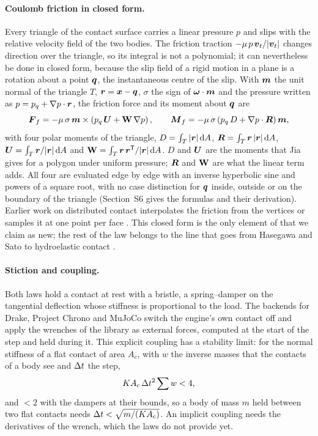 \paragraph{Coulomb friction in closed form.} Every triangle of the contact surface carries a
linear pressure $p$ and slips with the relative velocity field of the two bodies. The friction
traction $-\mu\,p\,\boldsymbol{v}_t/|\boldsymbol{v}_t|$ changes direction over the triangle, so its integral is not a
polynomial; it can nevertheless be done in closed form, because the slip field of a rigid
motion in a plane is a rotation about a point $\boldsymbol{q}$, the instantaneous centre of the slip. With
$\boldsymbol{m}$ the unit normal of the triangle $T$, $\boldsymbol{r} = \boldsymbol{x} - \boldsymbol{q}$, $\sigma$ the sign of $\boldsymbol{\omega}\cdot\boldsymbol{m}$ and
the pressure written as $p = p_q + \nabla p\cdot\boldsymbol{r}$, the friction force and its moment about
$\boldsymbol{q}$ are
\begin{equation}
  \boldsymbol{F}_f = -\mu\,\sigma\,\boldsymbol{m}\times\left(p_q\,\boldsymbol{U} + \mathbf{W}\,\nabla p\right), \qquad
  \boldsymbol{M}_f = -\mu\,\sigma\left(p_q\,D + \nabla p\cdot\boldsymbol{R}\right)\boldsymbol{m} ,
  \label{sh:friction}
\end{equation}
with four polar moments of the triangle,
$D = \int_T |\boldsymbol{r}|\,\mathrm{d} A$, $\boldsymbol{R} = \int_T \boldsymbol{r}\,|\boldsymbol{r}|\,\mathrm{d} A$,
$\boldsymbol{U} = \int_T \boldsymbol{r}/|\boldsymbol{r}|\,\mathrm{d} A$ and $\mathbf{W} = \int_T \boldsymbol{r}\,\boldsymbol{r}^{\mathsf T}/|\boldsymbol{r}|\,\mathrm{d} A$.
$D$ and $\boldsymbol{U}$ are the moments that Jia \cite{Jia1997} gives for a polygon under uniform
pressure; $\boldsymbol{R}$ and $\mathbf{W}$ are what the linear term adds. All four are evaluated edge
by edge with an inverse hyperbolic sine and powers of a square root, with no case distinction
for $\boldsymbol{q}$ inside, outside or on the boundary of the triangle (Section~S6 gives the formulas and
their derivation). Earlier work on distributed contact interpolates the friction from the
vertices or samples it at one point per face \cite{Hasegawa2004,Hippmann2004}. This closed
form is the only element of  that we claim as new; the rest of the law
belongs to the line that goes from Hasegawa and Sato \cite{Hasegawa2004} to hydroelastic
contact \cite{Elandt2019}.

\paragraph{Stiction and coupling.} Both laws hold a contact at rest with a bristle, a
spring--damper on the tangential deflection whose stiffness is proportional to the load. The backends for Drake, Project Chrono
and MuJoCo switch the engine's own contact off and apply the wrenches of the library as
external forces, computed at the start of the step and held during it. This explicit coupling
has a stability limit: for the normal stiffness of a flat contact of area $A_c$, with $w$ the
inverse masses that the contacts of a body see and $\Delta t$ the step,
\begin{equation}
  K A_c\,\Delta t^2 \sum w < 4 ,
  \label{sh:stability}
\end{equation}
and $<2$ with the dampers at their bounds, so a body of mass $m$ held between two flat contacts
needs $\Delta t < \sqrt{m/(K A_c)}$. An implicit coupling needs the derivatives of the wrench, which
the laws do not provide yet.

